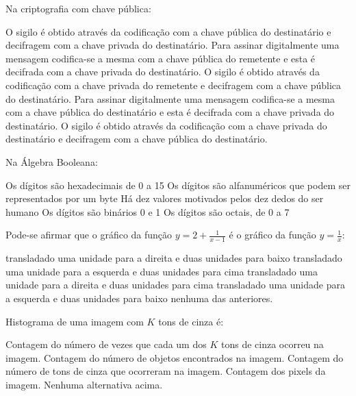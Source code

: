 \documentclass[12pt, addpoints]{exam}
\begin{document}
\begin{questions}
\question

Na criptografia com chave pública:


\begin{choices}
\choice O sigilo é obtido através da codificação com a chave pública do destinatário e decifragem com a chave privada do destinatário.
\choice Para assinar digitalmente uma mensagem codifica-se a mesma com a chave pública do remetente e esta é decifrada com a chave privada do destinatário.
\choice O sigilo é obtido através da codificação com a chave privada do remetente e decifragem com a chave pública do destinatário.
\choice Para assinar digitalmente uma mensagem codifica-se a mesma com a chave pública do destinatário e esta é decifrada com a chave privada do destinatário.
\choice O sigilo é obtido através da codificação com a chave privada do destinatário e decifragem com a chave pública do destinatário.
\end{choices}

\question

Na Álgebra Booleana:
\begin{choices}
\choice Os dígitos são hexadecimais de 0 a 15
\choice Os dígitos são alfanuméricos que podem ser representados por um byte
\choice Há dez valores motivados pelos dez dedos do ser humano
\choice Os dígitos são binários 0 e 1
\choice Os dígitos são octais, de 0 a 7
\end{choices}

\question

Pode-se afirmar que o gráfico da função \(y = 2 + \frac{1}{x - 1}\) é o gráfico da função \(y = \frac{1}{x}\):
\begin{choices}
\choice transladado uma unidade para a direita e duas unidades para baixo
\choice transladado uma unidade para a esquerda e duas unidades para cima
\choice transladado uma unidade para a direita e duas unidades para cima
\choice transladado uma unidade para a esquerda e duas unidades para baixo
\choice nenhuma das anteriores.
\end{choices}

\question

Histograma de uma imagem com \( K \) tons de cinza é:
\begin{choices}
\choice Contagem do número de vezes que cada um dos \( K \) tons de cinza ocorreu na imagem.
\choice Contagem do número de objetos encontrados na imagem.
\choice Contagem do número de tons de cinza que ocorreram na imagem.
\choice Contagem dos pixels da imagem.
\choice Nenhuma alternativa acima.
\end{choices}


\end{questions}
\end{document}
